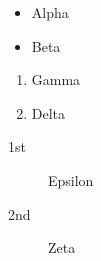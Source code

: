\documentclass{article}
\begin{document}
    \begin{itemize}
        \item Alpha
        \item Beta
    \end{itemize}
    
    \begin{enumerate}
        \item Gamma
        \item Delta
    \end{enumerate}
    
    \begin{description}
        \item[1st] Epsilon
        \item[2nd] Zeta
    \end{description}
\end{document}
